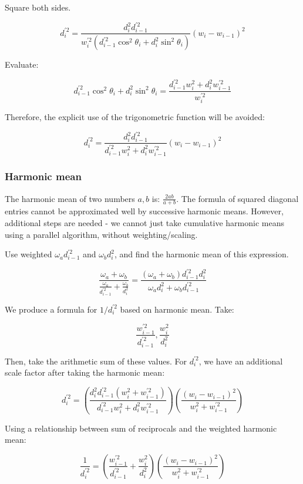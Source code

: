 \documentclass{article}
\begin{document}
Square both sides.

$$
d_i^{\prime2}
=
\frac{d_i^2 d_{i-1}^{\prime2}}{
	w_i^{\prime2}
	(d_{i-1}^{\prime2} \cos^2 \theta_i + d_i^2 \sin^2 \theta_i)
}
(w_i - w_{i-1})^2
$$

Evaluate:

$$
d_{i-1}^{\prime2} \cos^2 \theta_i + d_i^2 \sin^2 \theta_i
=
\frac{d_{i-1}^{\prime2} w_i^2 + d_i^2 w_{i-1}^{\prime2}}{w_i^{\prime2}}
$$

Therefore, the explicit use of the trigonometric function will be avoided:

$$
d_i^{\prime2}
=
\frac{d_i^2 d_{i-1}^{\prime2}}{
	d_{i-1}^{\prime2} w_i^2 + d_i^2 w_{i-1}^{\prime2}
}
(w_i - w_{i-1})^2
$$

\subsubsection*{Harmonic mean}

The harmonic mean of two numbers $a,b$ is: $\frac{2ab}{a+b}$. The formula of squared diagonal entries cannot be approximated well by successive harmonic means. However, additional steps are needed - we cannot just take cumulative harmonic means using a parallel algorithm, without weighting/scaling.

Use weighted $\omega_a d_{i-1}^{\prime2}$ and $\omega_b d_i^2$, and find the harmonic mean of this expression.

$$
\frac{\omega_a + \omega_b}{\frac{\omega_a}{d_{i-1}^{\prime2}} + \frac{\omega_b}{d_i^2}}
=
\frac{(\omega_a + \omega_b)d_{i-1}^{\prime2} d_i^2}{\omega_a d_i^2 + \omega_b d_{i-1}^{\prime2}}
$$

We produce a formula for $1/d_i^{\prime2}$ based on harmonic mean. Take:

$$
\frac{w_{i-1}^{\prime2}}{d_{i-1}^{\prime2}}, \frac{w_i^2}{d_i^2}
$$

Then, take the arithmetic sum of these values. For $d_i^{\prime2}$, we have an additional scale factor after taking the harmonic mean:

$$
d_i^{\prime2} =
\left(
	\frac{d_i^2 d_{i-1}^{\prime2} (w_i^2 + w_{i-1}^{\prime2})}{
		d_{i-1}^{\prime2} w_i^2 + d_i^2 w_{i-1}^{\prime2}
	}
\right)
\left(
	\frac{(w_i - w_{i-1})^2}{w_i^2 + w_{i-1}^{\prime2}}
\right)
$$

Using a relationship between sum of reciprocals and the weighted harmonic mean:

$$
\frac{1}{d_i^{\prime2}} =
\left(
	\frac{w_{i-1}^{\prime2}}{d_{i-1}^{\prime2}} + \frac{w_i^2}{d_i^2}
\right)
\left(
	\frac{(w_i - w_{i-1})^2}{w_i^2 + w_{i-1}^{\prime2}}
\right)
$$
\end{document}
